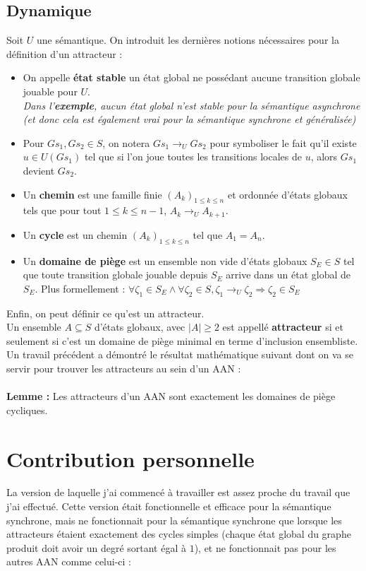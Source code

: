 \documentclass[12pt,a4paper]{article}
\begin{document}
\subsection{Dynamique}
Soit $U$ une sémantique. On introduit les dernières notions nécessaires pour la définition d'un attracteur :
\begin{itemize}
	\item On appelle \textbf{état stable} un état global ne possédant aucune transition globale jouable pour $U$.\\
	\emph{Dans l'\textbf{exemple}, aucun état global n'est stable pour la sémantique asynchrone (et donc cela est également vrai pour la sémantique synchrone et généralisée)}
	\item Pour $Gs_1,Gs_2\in S$, on notera $Gs_1\rightarrow _UGs_2$ pour symboliser le fait qu'il existe $u\in U(Gs_1)$ tel que si l'on joue toutes les transitions locales de $u$, alors $Gs_1$ devient $Gs_2$.
	\item Un \textbf{chemin} est une famille finie $(A_k)_{1\leq k\leq n}$ et ordonnée d'états globaux tels que pour tout $1\leq k\leq n-1$, $A_k\rightarrow _U A_{k+1}$.
	\item Un \textbf{cycle} est un chemin $(A_k)_{1\leq k\leq n}$ tel que $A_1=A_n$.
	\item Un \textbf{domaine de piège} est un ensemble non vide d'états globaux $S_E\in S$ tel que toute transition globale jouable depuis $S_E$ arrive dans un état global de $S_E$. Plus formellement : 
	$\forall\zeta _1\in S_E \wedge\forall\zeta _2\in S, \zeta _1 \rightarrow _U\zeta _2 \Rightarrow\zeta _2\in S_E$
\end{itemize}
Enfin, on peut définir ce qu'est un attracteur.\\
Un ensemble $A\subseteq S$ d'états globaux, avec $|A|\geq2$ est appellé \textbf{attracteur} si et seulement si c'est un domaine de piège minimal en terme d'inclusion ensembliste.\\
Un travail précédent a démontré le résultat mathématique suivant dont on va se servir pour trouver les attracteurs au sein d'un AAN :\\ \\
\textbf{Lemme :} Les attracteurs d'un AAN sont exactement les domaines de piège cycliques.

\section{Contribution personnelle}
La version de laquelle j'ai commencé à travailler est assez proche du travail que j'ai effectué. Cette version était fonctionnelle et efficace pour la sémantique synchrone, mais ne fonctionnait pour la sémantique synchrone que 
lorsque les attracteurs étaient exactement des cycles simples (chaque état global du graphe produit doit avoir un degré sortant égal à $1$), et ne fonctionnait pas pour les autres AAN comme celui-ci :
\end{document}
